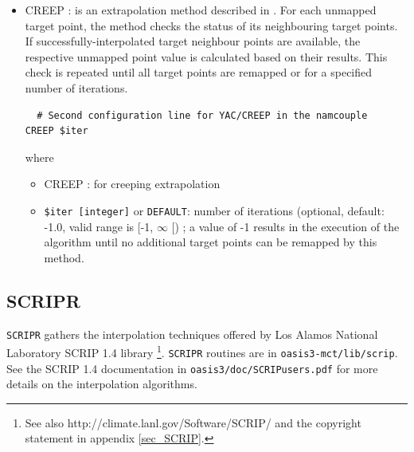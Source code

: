 \begin{itemize}
\begin{itemize}
\item {\tt \$src\_radius  [real]} or {\tt [string]} : if {\tt [real]}, gives value of the sphere radius for the computation of the source cell areas (optional, default: 1.0); if {\tt [string]} , can be :
\begin{itemize}
\item {\tt DEFAULT} : default value of 1.0 
\item {\tt EARTH} : hard-coded value of 6371229 m.
\item {\tt FILE} or {\tt USER} : the source cell areas is not computed but read in the auxiliary file {\tt areas.nc} 
\end{itemize}
\item {\tt \$tgt\_radius  [real]} or {\tt [string]}: same as {\tt \$src\_radius} but for the target cell areas
\end{itemize}

\item CREEP : is an extrapolation method described in \cite{Kara2007}. For each unmapped target point,
the method checks the status of its neighbouring target points. If successfully-interpolated target
neighbour points are available, the respective unmapped point value is calculated based on their
results. This check is repeated until all target points are remapped or for a specified number of
iterations.
\begin{verbatim}
  # Second configuration line for YAC/CREEP in the namcouple
CREEP $iter 
\end{verbatim}
where 
\begin{itemize}
\item CREEP : for creeping extrapolation
\item {\tt \$iter  [integer]} or {\tt DEFAULT}: number of iterations (optional, default: -1.0, valid range is [-1, $\infty$ [) ; a value of -1 results in the execution of the
algorithm until no additional target points can be remapped by this method.
\end{itemize}
 \end{itemize}

\subsection{SCRIPR}
\label{subsec_scripr}
 
  {\tt SCRIPR} gathers the interpolation techniques offered by Los
  Alamos National Laboratory SCRIP 1.4 library
  \citep{Jones99}\footnote{See also
    http://climate.lanl.gov/Software/SCRIP/ and the copyright
    statement in appendix \ref{sec_SCRIP}.}.  {\tt SCRIPR} routines
  are in {\tt oasis3-mct/lib/scrip}. See the SCRIP 1.4 documentation
  in {\tt oasis3/doc/SCRIPusers.pdf} for more details on the
  interpolation algorithms.
  
